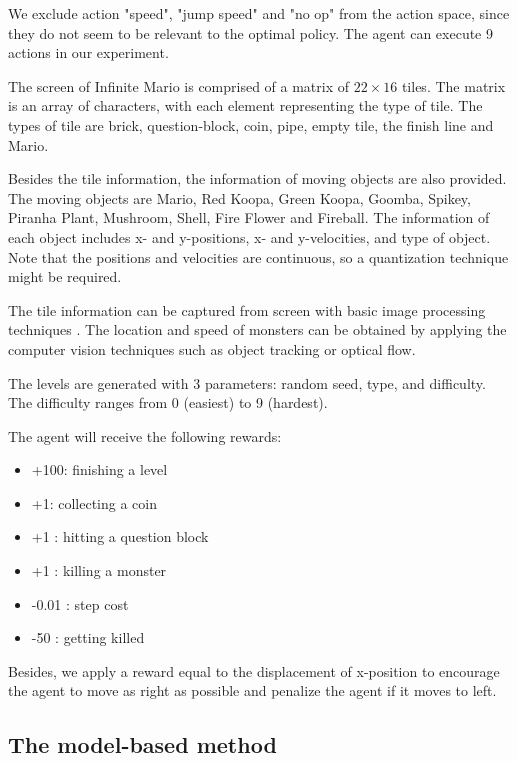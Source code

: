We exclude action "speed", "jump speed" and "no op" from the 
action space, since they do not seem to be relevant to the optimal policy.
The agent can execute 9 actions in our experiment.

The screen of Infinite Mario is comprised of a matrix of $22 \times 16$ tiles.
The matrix is an array of characters, with each element representing the type of tile.
The types of tile are brick, question-block, coin, pipe, empty tile, the finish line and Mario.

Besides the tile information, the information of moving objects are also provided. 
The moving objects are Mario, Red Koopa, Green Koopa, Goomba, Spikey, Piranha Plant, Mushroom, Shell, Fire Flower and Fireball.
The information of each object includes x- and y-positions, x- and y-velocities, and type of object.
Note that the positions and velocities are continuous, so a quantization technique might be required.

The tile information can be captured from screen with basic image processing techniques \cite{Yavar}.
The location and speed of monsters can be obtained by applying the computer vision techniques such
as object tracking or optical flow.

The levels are generated with 3 parameters: random seed, type, and difficulty.
The difficulty ranges from 0 (easiest) to 9 (hardest). 

The agent will receive the following rewards:
\begin{itemize}
\item +100: finishing a level
\item +1: collecting a coin
\item +1 : hitting a question block
\item +1 : killing a monster
\item -0.01 : step cost
\item -50 : getting killed
\end{itemize}

Besides, we apply a reward equal to the
displacement of x-position to encourage the agent to move as right as possible
and penalize the agent if it moves to left.

\subsection{The model-based method}


